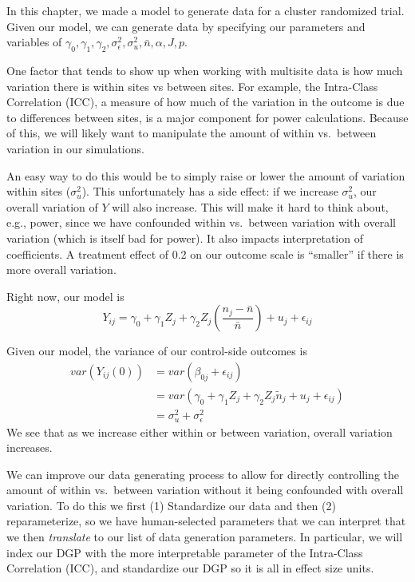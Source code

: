 \documentclass[
]{book}
\begin{document}
In this chapter, we made a model to generate data for a cluster randomized trial.
Given our model, we can generate data by specifying our parameters and variables of \(\gamma_{0}, \gamma_{1}, \gamma_{2}, \sigma^2_\epsilon, \sigma^2_u, \bar{n}, \alpha, J, p\).

One factor that tends to show up when working with multisite data is how much variation there is within sites vs between sites.
For example, the Intra-Class Correlation (ICC), a measure of how much of the variation in the outcome is due to differences between sites, is a major component for power calculations.
Because of this, we will likely want to manipulate the amount of within vs.~between variation in our simulations.

An easy way to do this would be to simply raise or lower the amount of variation within sites (\(\sigma^2_u\)).
This unfortunately has a side effect: if we increase \(\sigma^2_u\), our overall variation of \(Y\) will also increase.
This will make it hard to think about, e.g., power, since we have confounded within vs.~between variation with overall variation (which is itself bad for power).
It also impacts interpretation of coefficients.
A treatment effect of 0.2 on our outcome scale is ``smaller'' if there is more overall variation.

Right now, our model is
\[ Y_{ij} = \gamma_{0} + \gamma_{1} Z_j + \gamma_2 Z_j \left(\frac{n_j - \bar{n}}{\bar{n}} \right)  + u_j + \epsilon_{ij}  \]

Given our model, the variance of our control-side outcomes is
\[ 
\begin{aligned}
var( Y_{ij}(0) ) &= var( \beta_{0j} + \epsilon_{ij} ) \\
 &= var( \gamma_{0} + \gamma_{1} Z_j + \gamma_{2}Z_j \tilde{n}_j + u_j + \epsilon_{ij} ) \\
&= \sigma^2_u + \sigma^2_\epsilon
\end{aligned}
\]
We see that as we increase either within or between variation, overall variation increases.

We can improve our data generating process to allow for directly controlling the amount of within vs.~between variation without it being confounded with overall variation.
To do this we first (1) Standardize our data and then (2) reparameterize, so we have human-selected parameters that we can interpret that we then \emph{translate} to our list of data generation parameters.
In particular, we will index our DGP with the more interpretable parameter of the Intra-Class Correlation (ICC), and standardize our DGP so it is all in effect size units.
\end{document}
